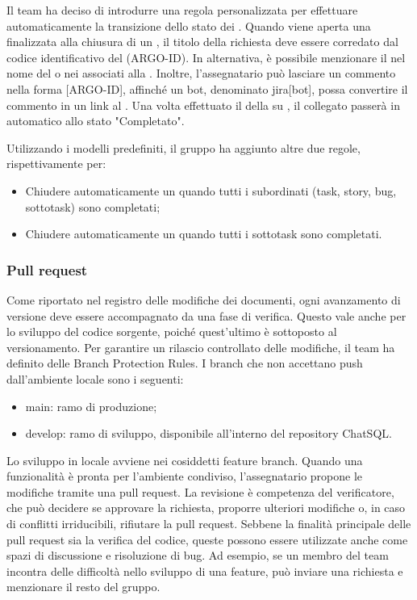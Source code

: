 \vspace{0.5\baselineskip}
\par Il team ha deciso di introdurre una regola personalizzata per effettuare automaticamente la transizione dello stato dei . Quando viene aperta una  finalizzata alla chiusura di un , il titolo della richiesta deve essere corredato dal codice identificativo del  (ARGO-ID). In alternativa, è possibile menzionare il  nel nome del  o nei  associati alla . Inoltre, l’assegnatario può lasciare un commento nella forma [ARGO-ID], affinché un bot, denominato jira[bot], possa convertire il commento in un link al  . Una volta effettuato il  della  su , il  collegato passerà in automatico allo stato "Completato".
\par Utilizzando i modelli predefiniti, il gruppo ha aggiunto altre due regole, rispettivamente per:
\begin{itemize}
  \item Chiudere automaticamente un  quando tutti i  subordinati (task, story, bug, sottotask) sono completati;
  \item Chiudere automaticamente un  quando tutti i sottotask sono completati.
\end{itemize}

\subsubsection{Pull request}
Come riportato nel registro delle modifiche dei documenti, ogni avanzamento di versione deve essere accompagnato da una fase di verifica. Questo vale anche per lo sviluppo del codice sorgente, poiché quest’ultimo è sottoposto al versionamento. Per garantire un rilascio controllato delle modifiche, il team ha definito delle Branch Protection Rules. I branch che non accettano push dall’ambiente locale sono i seguenti: 
\begin{itemize}
  \item main: ramo di produzione;
  \item develop: ramo di sviluppo, disponibile all'interno del repository ChatSQL.
\end{itemize}
\par Lo sviluppo in locale avviene nei cosiddetti feature branch. Quando una funzionalità è pronta per l'ambiente condiviso, l'assegnatario propone le modifiche tramite una pull request. La revisione è competenza del verificatore, che può decidere se approvare la richiesta, proporre ulteriori modifiche o, in caso di conflitti irriducibili, rifiutare la pull request. Sebbene la finalità principale delle pull request sia la verifica del codice, queste possono essere utilizzate anche come spazi di discussione e risoluzione di bug. Ad esempio, se un membro del team incontra delle difficoltà nello sviluppo di una feature, può inviare una richiesta e menzionare il resto del gruppo.

